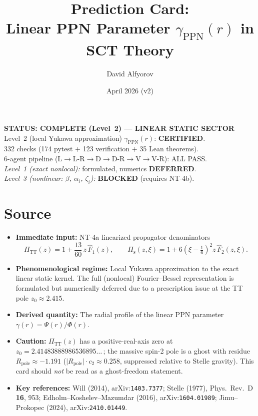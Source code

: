 \documentclass[11pt,a4paper]{article}
\title{%
  \textbf{Prediction Card:}\\[4pt]
  \Large Linear PPN Parameter $\gamma_{\mathrm{PPN}}(r)$ in SCT Theory
}
\author{David Alfyorov}
\date{April 2026 (v2)}
\begin{document}
\maketitle

\begin{center}
\end{center}

\begin{center}
  \colorbox{statusgreen!15}{\parbox{0.78\textwidth}{\centering
    \textbf{\color{statusgreen} STATUS: COMPLETE (Level~2) --- LINEAR STATIC SECTOR}\\[2pt]
    \small Level~2 (local Yukawa approximation) $\gamma_{\mathrm{PPN}}(r)$: \textbf{CERTIFIED}.\\
    332 checks (174 pytest $+$ 123 verification $+$ 35 Lean theorems).\\[2pt]
    6-agent pipeline (L$\to$L-R$\to$D$\to$D-R$\to$V$\to$V-R): ALL PASS.\\[4pt]
    \textit{Level~1 (exact nonlocal):} formulated, numerics \textbf{DEFERRED}.\\
    \textit{Level~3 (nonlinear: $\beta$, $\alpha_i$, $\zeta_i$):} \textbf{BLOCKED} (requires NT-4b).
  }}
\end{center}

\section{Source}

\begin{itemize}[leftmargin=2em]
  \item \textbf{Immediate input:} NT-4a linearized propagator denominators
  \[
    \Pi_{\mathrm{TT}}(z) = 1 + \frac{13}{60}\, z\, \hat F_1(z), \qquad
    \Pi_{\mathrm{s}}(z,\xi) = 1 + 6\!\left(\xi-\tfrac{1}{6}\right)^{\!2} z\, \hat F_2(z,\xi).
  \]
  \item \textbf{Phenomenological regime:} Local Yukawa approximation to the
  exact linear static kernel.  The full (nonlocal) Fourier--Bessel
  representation is formulated but numerically deferred due to a prescription
  issue at the TT pole $z_0 \approx 2.415$.
  \item \textbf{Derived quantity:} The radial profile of the linear PPN
  parameter $\gamma(r) = \Psi(r)/\Phi(r)$.
  \item \textbf{Caution:} $\Pi_{\mathrm{TT}}(z)$ has a positive-real-axis zero
  at $z_0 = 2.41483888986536895\ldots$\,; the massive spin-2 pole is a ghost
  with residue $R_{\mathrm{pole}} \approx -1.191$ ($\lvert R_{\mathrm{pole}}\rvert \cdot c_2 \approx 0.258$,
  suppressed relative to Stelle gravity).  This card
  should \emph{not} be read as a ghost-freedom statement.
  \item \textbf{Key references:}
    Will (2014), arXiv:\texttt{1403.7377};
    Stelle (1977), Phys.\ Rev.\ D \textbf{16}, 953;
    Edholm--Koshelev--Mazumdar (2016), arXiv:\texttt{1604.01989};
    Jimu--Prokopec (2024), arXiv:\texttt{2410.01449}.
\end{itemize}
\end{document}
